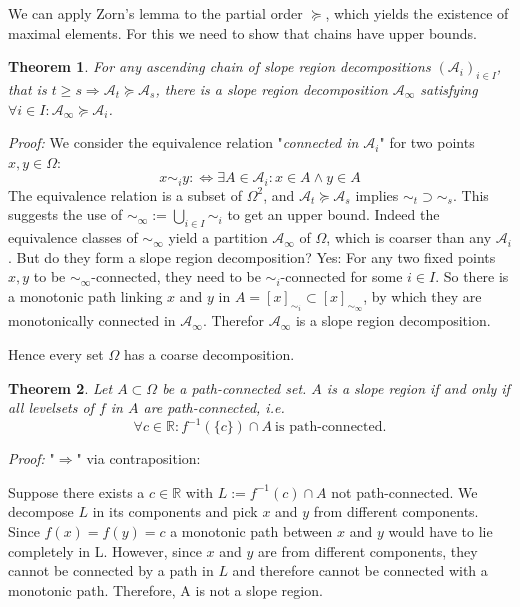 \documentclass[11pt,twoside,twocolumn,a4paper]{article}
\theoremstyle{plain}
\newtheorem{thm}{Theorem}[section] %
\theoremstyle{definition}
\begin{document}
We can apply Zorn's lemma \cite{zorn1935remark} to the partial order $\succeq$, which yields the existence of maximal elements. For this we need to show that chains have upper bounds.
\begin{thm}
For any ascending chain of slope region decompositions $\left(\mathcal{A}_i\right)_{i\in I}$, that is $t\geq s \Rightarrow \mathcal{A}_t \succeq \mathcal{A}_s$, there is a slope region decomposition $\mathcal{A}_\infty$ satisfying $\forall i\in I:\mathcal{A}_\infty \succeq \mathcal{A}_i$.
\end{thm}
\emph{Proof:}
We consider the equivalence relation "\emph{connected in $\mathcal{A}_i$}" for two points $x,y\in \Omega$:
$$x\sim_i y :\Leftrightarrow \exists A \in \mathcal{A}_i: x\in A \land y\in A$$
The equivalence relation is a subset of $\Omega^2$, and $\mathcal{A}_t \succeq \mathcal{A}_s$ implies $\sim_t \supset \sim_s$.
This suggests the use of $\sim_\infty := \bigcup_{i\in I} \sim_i$ to get an upper bound.
Indeed the equivalence classes of $\sim_\infty$ yield a partition $\mathcal{A}_\infty$ of $\Omega$, which is coarser than any $\mathcal{A}_i$.
But do they form a slope region decomposition?
Yes: For any two fixed points $x,y$ to be $\sim_\infty$-connected, they need to be $\sim_i$-connected for some $i\in I$. So there is a monotonic path linking $x$ and $y$ in $A=[x]_{\sim_i}\subset[x]_{\sim_\infty}$, by which they are monotonically connected in $\mathcal{A}_\infty$. Therefor $\mathcal{A}_\infty$ is a slope region decomposition.


Hence every set $\Omega$ has a coarse decomposition.

\begin{thm}
\label{slope_iff_conn_lvlsets}
Let $A \subset \Omega$ be a path-connected set.
$A$ is a slope region if and only if all levelsets of $f$ in $A$ are path-connected, i.e.
\begin{equation*}
\forall c \in \mathbb{R}: f^{-1}(\{c\}) \cap A ~ \text{is path-connected}.
\end{equation*}
\end{thm}

\emph{Proof:} "$\Rightarrow$" via contraposition:

Suppose there exists a $c \in \mathbb{R}$ with $L := f^{-1}(c) \cap A$ not path-connected.
We decompose $L$ in its components and pick $x$ and $y$ from different components.
Since $f(x) = f(y) = c$ a monotonic path between $x$ and $y$ would have to lie completely in L.
However, since $x$ and $y$ are from different components, they cannot be connected by a path in $L$ and therefore cannot be connected with a monotonic path.
Therefore, A is not a slope region.
\end{document}
